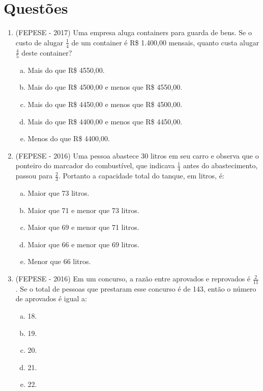 \section{Questões}
 
 \begin{enumerate}
  \item (FEPESE - 2017) Uma empresa aluga containers para guarda de bens. Se o custo de alugar $\frac{1}{4}$ de um container é R\$ 1.400,00 mensais, quanto custa alugar $\frac{4}{5}$ deste container?
  \begin{enumerate}[a)]
  \item Mais do que R\$ 4550,00. 
  \item Mais do que R\$ 4500,00 e menos que R\$ 4550,00. 
  \item Mais do que R\$ 4450,00 e menos que R\$ 4500,00. 
  \item Mais do que R\$ 4400,00 e menos que R\$ 4450,00. 
  \item Menos do que R\$ 4400,00. 
  \end{enumerate}
  
  \item (FEPESE - 2016) Uma pessoa abastece 30 litros em seu carro e observa que o ponteiro do marcador do combustível, que indicava $\frac{1}{4}$ antes do abastecimento, passou para $\frac{2}{3}$. Portanto a capacidade total do tanque, em litros, é:
  \begin{enumerate}[a)]
  \item Maior que 73 litros.
  \item Maior que 71 e menor que 73 litros.
  \item Maior que 69 e menor que 71 litros.
  \item Maior que 66 e menor que 69 litros.
  \item Menor que 66 litros.
  \end{enumerate}
  
  \item (FEPESE - 2016) Em um concurso, a razão entre aprovados e reprovados é $\frac{2}{11}$. Se o total de pessoas que prestaram esse concurso é de 143, então o número de aprovados é igual a:
  \begin{enumerate}[a)]
  \item 18.
  \item 19.
  \item 20.
  \item 21.
  \item 22.
  \end{enumerate}
  

\end{enumerate}
